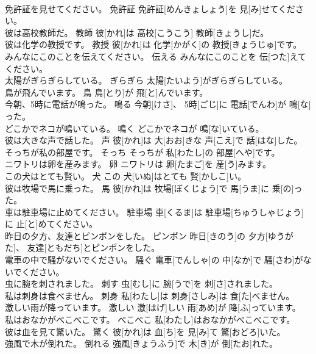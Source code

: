 \documentclass[8pt]{extreport}
\begin{document}
\begin{CJK}{UTF8}{min}
\\	免許証を見せてください。	免許証	免許証[めんきょしょう]を 見[み]せてください。	
\\	彼は高校教師だ。	教師	彼[かれ]は 高校[こうこう] 教師[きょうし]だ。	
\\	彼は化学の教授です。	教授	彼[かれ]は 化学[かがく]の 教授[きょうじゅ]です。	
\\	みんなにこのことを伝えてください。	伝える	みんなにこのことを 伝[つた]えてください。	
\\	太陽がぎらぎらしている。	ぎらぎら	太陽[たいよう]がぎらぎらしている。	
\\	鳥が飛んでいます。	鳥	鳥[とり]が 飛[と]んでいます。	
\\	今朝、5時に電話が鳴った。	鳴る	今朝[けさ]、 5時[ごじ]に 電話[でんわ]が 鳴[な]った。	
\\	どこかでネコが鳴いている。	鳴く	どこかでネコが 鳴[な]いている。	
\\	彼は大きな声で話した。	声	彼[かれ]は 大[おお]きな 声[こえ]で 話[はな]した。	
\\	そっちが私の部屋です。	そっち	そっちが 私[わたし]の 部屋[へや]です。	
\\	ニワトリは卵を産みます。	卵	ニワトリは 卵[たまご]を 産[う]みます。	
\\	この犬はとても賢い。	犬	この 犬[いぬ]はとても 賢[かしこ]い。	
\\	彼は牧場で馬に乗った。	馬	彼[かれ]は 牧場[ぼくじょう]で 馬[うま]に 乗[の]った。	
\\	車は駐車場に止めてください。	駐車場	車[くるま]は 駐車場[ちゅうしゃじょう]に 止[と]めてください。	
\\	昨日の夕方、友達とピンポンをした。	ピンポン	昨日[きのう]の 夕方[ゆうがた]、 友達[ともだち]とピンポンをした。	
\\	電車の中で騒がないでください。	騒ぐ	電車[でんしゃ]の 中[なか]で 騒[さわ]がないでください。	
\\	虫に腕を刺されました。	刺す	虫[むし]に 腕[うで]を 刺[さ]されました。	
\\	私は刺身は食べません。	刺身	私[わたし]は 刺身[さしみ]は 食[た]べません。	
\\	激しい雨が降っています。	激しい	激[はげ]しい 雨[あめ]が 降[ふ]っています。	
\\	私はおなかがぺこぺこです。	ぺこぺこ	私[わたし]はおなかがぺこぺこです。	
\\	彼は血を見て驚いた。	驚く	彼[かれ]は 血[ち]を 見[み]て 驚[おどろ]いた。	
\\	強風で木が倒れた。	倒れる	強風[きょうふう]で 木[き]が 倒[たお]れた。	

\end{CJK}
\end{document}
